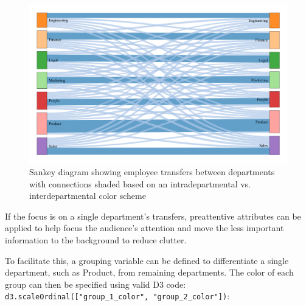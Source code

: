 \documentclass[
]{book}
\newenvironment{Shaded}{\begin{snugshade}}{\end{snugshade}}
\newcommand{\CommentTok}[1]{\textcolor[rgb]{0.56,0.35,0.01}{\textit{#1}}}
\newcommand{\FunctionTok}[1]{\textcolor[rgb]{0.00,0.00,0.00}{#1}}
\newcommand{\NormalTok}[1]{#1}
\newcommand{\OtherTok}[1]{\textcolor[rgb]{0.56,0.35,0.01}{#1}}
\newcommand{\SpecialCharTok}[1]{\textcolor[rgb]{0.00,0.00,0.00}{#1}}
\newcommand{\StringTok}[1]{\textcolor[rgb]{0.31,0.60,0.02}{#1}}
\begin{document}
\begin{figure}

{\centering \includegraphics[width=1\linewidth]{graphics/sankey_3} 

}

\caption{Sankey diagram showing employee transfers between departments with connections shaded based on an intradepartmental vs. interdepartmental color scheme}\label{fig:sankey-3}
\end{figure}

If the focus is on a single department's transfers, preattentive attributes can be applied to help focus the audience's attention and move the less important information to the background to reduce clutter.

To facilitate this, a grouping variable can be defined to differentiate a single department, such as Product, from remaining departments. The color of each group can then be specified using valid D3 code: \texttt{d3.scaleOrdinal({[}"group\_1\_color",\ "group\_2\_color"{]})}:

\begin{Shaded}
\end{Shaded}
\end{document}

